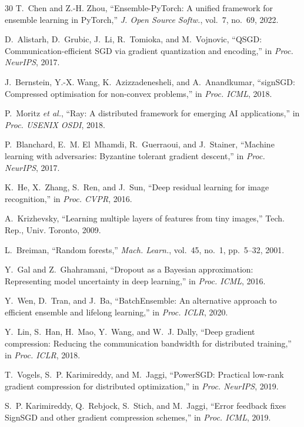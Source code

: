 \documentclass[journal,twoside]{IEEEtran}
\begin{document}
\begin{thebibliography}{30}
T.~Chen and Z.-H. Zhou,
``{Ensemble-PyTorch}: A unified framework for ensemble learning in
{PyTorch},''
\emph{J. Open Source Softw.}, vol.~7, no.~69, 2022.

D.~Alistarh, D.~Grubic, J.~Li, R.~Tomioka, and M.~Vojnovic,
``{QSGD}: Communication-efficient {SGD} via gradient quantization and
encoding,''
in \emph{Proc. NeurIPS}, 2017.

J.~Bernstein, Y.-X. Wang, K.~Azizzadenesheli, and A.~Anandkumar,
``{signSGD}: Compressed optimisation for non-convex problems,''
in \emph{Proc. ICML}, 2018.

P.~Moritz \emph{et al.},
``Ray: A distributed framework for emerging {AI} applications,''
in \emph{Proc. USENIX OSDI}, 2018.

P.~Blanchard, E.~M. El~Mhamdi, R.~Guerraoui, and J.~Stainer,
``Machine learning with adversaries: Byzantine tolerant gradient
descent,''
in \emph{Proc. NeurIPS}, 2017.

K.~He, X.~Zhang, S.~Ren, and J.~Sun,
``Deep residual learning for image recognition,''
in \emph{Proc. CVPR}, 2016.

A.~Krizhevsky,
``Learning multiple layers of features from tiny images,''
Tech. Rep., Univ. Toronto, 2009.

L.~Breiman,
``Random forests,''
\emph{Mach. Learn.}, vol.~45, no.~1, pp.~5--32, 2001.

Y.~Gal and Z.~Ghahramani,
``Dropout as a Bayesian approximation: Representing model uncertainty
in deep learning,''
in \emph{Proc. ICML}, 2016.

Y.~Wen, D.~Tran, and J.~Ba,
``{BatchEnsemble}: An alternative approach to efficient ensemble and
lifelong learning,''
in \emph{Proc. ICLR}, 2020.

Y.~Lin, S.~Han, H.~Mao, Y.~Wang, and W.~J. Dally,
``Deep gradient compression: Reducing the communication bandwidth for
distributed training,''
in \emph{Proc. ICLR}, 2018.

T.~Vogels, S.~P. Karimireddy, and M.~Jaggi,
``{PowerSGD}: Practical low-rank gradient compression for distributed
optimization,''
in \emph{Proc. NeurIPS}, 2019.

S.~P. Karimireddy, Q.~Rebjock, S.~Stich, and M.~Jaggi,
``Error feedback fixes {SignSGD} and other gradient compression
schemes,''
in \emph{Proc. ICML}, 2019.


\end{thebibliography}
\end{document}
